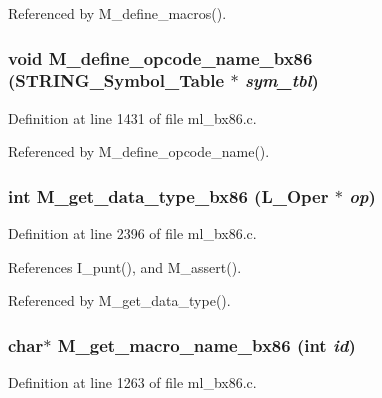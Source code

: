 Referenced by M\_\-define\_\-macros().
\subsubsection{\setlength{\rightskip}{0pt plus 5cm}void M\_\-define\_\-opcode\_\-name\_\-bx86 (\bf{STRING\_\-Symbol\_\-Table} $\ast$ {\em sym\_\-tbl})}\label{m__bx86_8h_f6c7f2a7412c8d3dd02b327d8830432e}




Definition at line 1431 of file ml\_\-bx86.c.

Referenced by M\_\-define\_\-opcode\_\-name().
\subsubsection{\setlength{\rightskip}{0pt plus 5cm}int M\_\-get\_\-data\_\-type\_\-bx86 (L\_\-Oper $\ast$ {\em op})}\label{m__bx86_8h_a7d1f699532530fd65054fbf757cf766}




Definition at line 2396 of file ml\_\-bx86.c.

References I\_\-punt(), and M\_\-assert().

Referenced by M\_\-get\_\-data\_\-type().
\subsubsection{\setlength{\rightskip}{0pt plus 5cm}char$\ast$ M\_\-get\_\-macro\_\-name\_\-bx86 (int {\em id})}\label{m__bx86_8h_60523ef5cc26fa6fbb39603bf8397e01}




Definition at line 1263 of file ml\_\-bx86.c.

